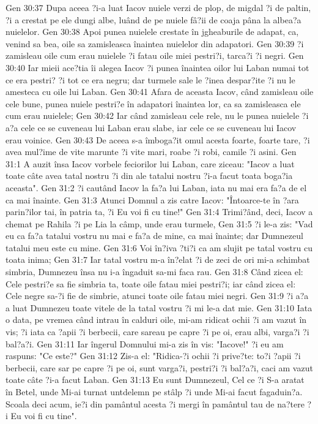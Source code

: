 Gen 30:37  Dupa aceea ?i-a luat Iacov nuiele verzi de plop, de migdal ?i de paltin, ?i a crestat pe ele dungi albe, luând de pe nuiele fâ?ii de coaja pâna la albea?a nuielelor.
Gen 30:38  Apoi punea nuielele crestate în jgheaburile de adapat, ca, venind sa bea, oile sa zamisleasca înaintea nuielelor din adapatori.
Gen 30:39  ?i zamisleau oile cum erau nuielele ?i fatau oile miei pestri?i, tarca?i ?i negri.
Gen 30:40  Iar mieii ace?tia îi alegea Iacov ?i punea înaintea oilor lui Laban numai tot ce era pestri? ?i tot ce era negru; dar turmele sale le ?inea despar?ite ?i nu le amesteca cu oile lui Laban.
Gen 30:41  Afara de aceasta Iacov, când zamisleau oile cele bune, punea nuiele pestri?e în adapatori înaintea lor, ca sa zamisleasca ele cum erau nuielele;
Gen 30:42  Iar când zamisleau cele rele, nu le punea nuielele ?i a?a cele ce se cuveneau lui Laban erau slabe, iar cele ce se cuveneau lui Iacov erau voinice.
Gen 30:43  De aceea s-a îmboga?it omul acesta foarte, foarte tare, ?i avea mul?ime de vite marunte ?i vite mari, roabe ?i robi, camile ?i asini.
Gen 31:1  A auzit însa Iacov vorbele feciorilor lui Laban, care ziceau: "Iacov a luat toate câte avea tatal nostru ?i din ale tatalui nostru ?i-a facut toata boga?ia aceasta".
Gen 31:2  ?i cautând Iacov la fa?a lui Laban, iata nu mai era fa?a de el ca mai înainte.
Gen 31:3  Atunci Domnul a zis catre Iacov: "Întoarce-te în ?ara parin?ilor tai, în patria ta, ?i Eu voi fi cu tine!"
Gen 31:4  Trimi?ând, deci, Iacov a chemat pe Rahila ?i pe Lia la câmp, unde erau turmele,
Gen 31:5  ?i le-a zis: "Vad eu ca fa?a tatalui vostru nu mai e fa?a de mine, ca mai înainte; dar Dumnezeul tatalui meu este cu mine.
Gen 31:6  Voi în?iva ?ti?i ca am slujit pe tatal vostru cu toata inima;
Gen 31:7  Iar tatal vostru m-a în?elat ?i de zeci de ori mi-a schimbat simbria, Dumnezeu însa nu i-a îngaduit sa-mi faca rau.
Gen 31:8  Când zicea el: Cele pestri?e sa fie simbria ta, toate oile fatau miei pestri?i; iar când zicea el: Cele negre sa-?i fie de simbrie, atunci toate oile fatau miei negri.
Gen 31:9  ?i a?a a luat Dumnezeu toate vitele de la tatal vostru ?i mi le-a dat mie.
Gen 31:10  Iata o data, pe vremea când intrau în calduri oile, mi-am ridicat ochii ?i am vazut în vis; ?i iata ca ?apii ?i berbecii, care sareau pe capre ?i pe oi, erau albi, varga?i ?i bal?a?i.
Gen 31:11  Iar îngerul Domnului mi-a zis în vis: "Iacove!" ?i eu am raspuns: "Ce este?"
Gen 31:12  Zis-a el: "Ridica-?i ochii ?i prive?te: to?i ?apii ?i berbecii, care sar pe capre ?i pe oi, sunt varga?i, pestri?i ?i bal?a?i, caci am vazut toate câte ?i-a facut Laban.
Gen 31:13  Eu sunt Dumnezeul, Cel ce ?i S-a aratat în Betel, unde Mi-ai turnat untdelemn pe stâlp ?i unde Mi-ai facut fagaduin?a. Scoala deci acum, ie?i din pamântul acesta ?i mergi în pamântul tau de na?tere ?i Eu voi fi cu tine".
